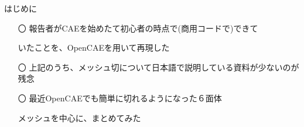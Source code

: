 \begin{frame}{はじめに}
  \begin{itemize}[itemsep=2.5ex, leftmargin=3mm]
      \large
      \item[〇] 報告者がCAEを始めたて初心者の時点で(商用コードで)できて

                いたことを、OpenCAEを用いて再現した

      \item[〇] 上記のうち、メッシュ切について日本語で説明している資料が少ないのが残念

      \item[〇] 最近OpenCAEでも簡単に切れるようになった６面体

	        メッシュを中心に、まとめてみた
  \end{itemize}
\end{frame}
